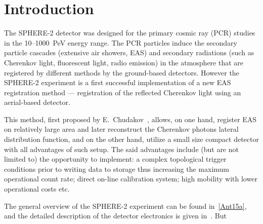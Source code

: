\documentclass[final,5p,times,twocolumn]{elsarticle}
\begin{document}
\section{Introduction}
The SPHERE-2 detector was designed for the primary cosmic ray (PCR) studies in the 10--1000~PeV energy range. The PCR particles induce the secondary particle cascades (extensive air showers, EAS) and secondary radiations (such as Cherenkov light, fluorescent light, radio emission) in the atmosphere that are registered by different methods by the ground-based detectors. However the SPHERE-2 experiment is a first successful implementation of a new EAS registration method --- registration of the reflected Cherenkov light using an aerial-based detector. 

This method, first proposed by E.~Chudakov~\cite{chu74}, allows, on one hand, register EAS on relatively large area and later reconstruct the Cherenkov photons lateral distribution function, and on the other hand, utilize a small size compact detector with all advantages of such setup. The said advantages include (but are not limited to) the opportunity to implement: a complex topological trigger conditions prior to writing data to storage thus increasing the maximum operational count rate; direct on-line calibration system; high mobility with lower operational costs etc.

The general overview of the SPHERE-2 experiment can be found in~\ref{Ant15a}, and the detailed description of the detector electronics is given in~\cite{Ant20}. But 

\end{document}
